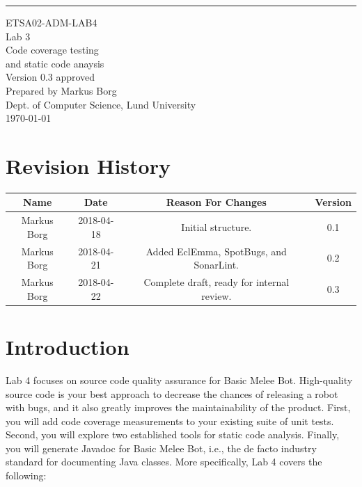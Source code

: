 \documentclass{scrreprt}
\date{}
\def\myversion{0.3 }
\begin{document}
\begin{flushright}
    \rule{16cm}{5pt}\vskip1cm
    \begin{bfseries}
    	\LARGE{ETSA02-ADM-LAB4}\\
    	\vspace{1.5cm}
        \Huge{Lab 3}\\
        \vspace{0.5cm}
        Code coverage testing\\
        \vspace{0.5cm}
        and static code anaysis\\
        \vspace{1.5cm}
        \LARGE{Version \myversion approved}\\
        \vspace{1.5cm}
        Prepared by Markus Borg\\
        Dept. of Computer Science, Lund University\\
        \vspace{1.5cm}
        \today\\
    \end{bfseries}
\end{flushright}


\chapter*{Revision History}

\begin{center}
    \begin{tabular}{|c|c|c|c|}
        \hline
	    Name & Date & Reason For Changes & Version\\
        \hline
	    Markus Borg & 2018-04-18 & Initial structure. & 0.1\\
        \hline
        Markus Borg & 2018-04-21 & Added EclEmma, SpotBugs, and SonarLint. & 0.2\\
        \hline
        Markus Borg & 2018-04-22 & Complete draft, ready for internal review. & 0.3\\
        \hline
    \end{tabular}
\end{center}

\chapter{Introduction}
Lab 4 focuses on source code quality assurance for Basic Melee Bot. High-quality source code is your best approach to decrease the chances of releasing a robot with bugs, and it also greatly improves the maintainability of the product. First, you will add code coverage measurements to your existing suite of unit tests. Second, you will explore two established tools for static code analysis. Finally, you will generate Javadoc for Basic Melee Bot, i.e., the de facto industry standard for documenting Java classes. More specifically, Lab 4 covers the following:
\end{document}
